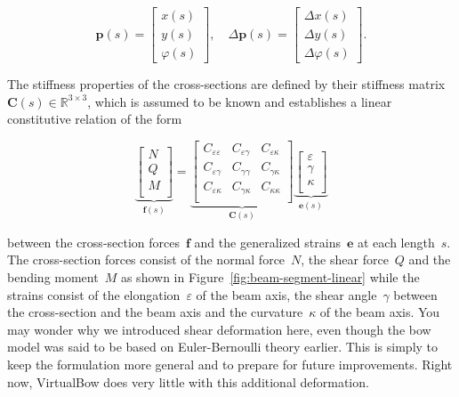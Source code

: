 \begin{equation}
\boldsymbol{p}(s) = \begin{bmatrix}
x(s) \\
y(s) \\
\varphi(s)
\end{bmatrix},
\quad
\Delta\boldsymbol{p}(s) = \begin{bmatrix}
\Delta x(s) \\
\Delta y(s) \\
\Delta \varphi(s)
\end{bmatrix}.
\end{equation}

The stiffness properties of the cross-sections are defined by their stiffness matrix~$\boldsymbol{C}(s) \in \mathbb{R}^{3 \times 3}$, which is assumed to be known and establishes a linear constitutive relation of the form

\begin{equation}
\underbrace{
\begin{bmatrix}
N \\
Q \\
M \\
\end{bmatrix}
}_{\boldsymbol{f}(s)}
=
\underbrace{
\begin{bmatrix}
C_{\varepsilon\varepsilon} & C_{\varepsilon\gamma} & C_{\varepsilon\kappa} \\
C_{\varepsilon\gamma} & C_{\gamma\gamma} & C_{\gamma\kappa} \\
C_{\varepsilon\kappa} & C_{\gamma\kappa} & C_{\kappa\kappa} \\
\end{bmatrix}
}_{\boldsymbol{C}(s)}
\underbrace{
\begin{bmatrix}
\varepsilon \\
\gamma \\
\kappa \\
\end{bmatrix}
}_{\boldsymbol{e}(s)} \label{eq:section-stiffness-matrix}
\end{equation}

between the cross-section forces~$\boldsymbol{f}$ and the generalized strains~$\boldsymbol{e}$ at each length~$s$.
The cross-section forces consist of the normal force~$N$, the shear force~$Q$ and the bending moment~$M$ as shown in Figure~\ref{fig:beam-segment-linear} while the strains consist of the elongation~$\varepsilon$ of the beam axis, the shear angle~$\gamma$ between the cross-section and the beam axis and the curvature~$\kappa$ of the beam axis.
You may wonder why we introduced shear deformation here, even though the bow model was said to be based on Euler-Bernoulli theory earlier.
This is simply to keep the formulation more general and to prepare for future improvements.
Right now, VirtualBow does very little with this additional deformation.

